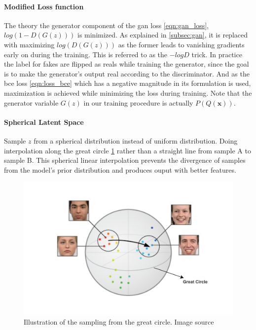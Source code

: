 \paragraph{Modified Loss function}
The theory the generator component of the \ac{gan} loss \ref{eqn:gan_loss}, $log(1-D(G(z)))$ is minimized. As explained in \ref{subsec:gan}, it is replaced with maximizing $log(D(G(z)))$ as the former leads to vanishing gradients early on during the training. This is referred to as the $-logD$ trick. In practice the label for fakes are flipped as reals while training the generator, since the goal is to make the generator's output real according to the discriminator. And as the \ac{bce} loss \ref{eqn:loss_bce} which has a negative magnitude in its formulation is used, maximization is achieved while minimizing the loss during training. Note that the generator variable $G(z)$ in our training procedure is actually $P(Q(\textbf{x}))$. 

\paragraph{Spherical Latent Space}
Sample $z$ from a spherical distribution instead of uniform distribution. Doing interpolation along the great circle \ref{fig:great_circle} rather than a straight line from sample A to sample B. This spherical linear interpolation prevents the divergence of samples from the model's prior distribution and produces ouput with better features.

\begin{figure}[h] 
    \centering
    \includegraphics[width=\textwidth]{figures/background/sphericalZ.png}
    \caption{Illustration of the sampling from the great circle. Image source \cite{spherical_sampling}}
    \label{fig:great_circle}
\end{figure}

